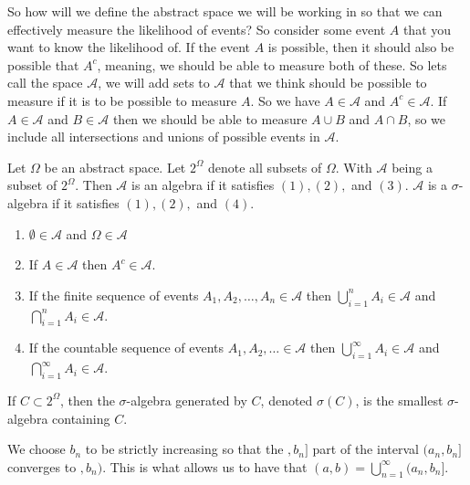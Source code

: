 \documentclass[../main.tex]{subfiles}
\begin{document}
\begin{remark}
So how will we define the abstract space we will be working in so that we can effectively measure the likelihood of events? So consider some event $A$ that you want to know the likelihood of. If the event $A$ is possible, then it should also be possible that $A^c$, meaning, we should be able to measure both of these. So lets call the space $\mathcal{A}$, we will add sets to $\mathcal{A}$ that we think should be possible to measure if it is to be possible to measure $A$. So we have $A \in \mathcal{A}$ and $ A^c \in \mathcal{A} $. If $A \in \mathcal{A}$ and $ B \in \mathcal{A} $ then we should be able to measure $ A \cup B $ and $ A \cap B $, so we include all intersections and unions of possible events in $\mathcal{A}$.
\end{remark}



\begin{definition}\label{def:sigma algebra}
Let $\Omega$ be an abstract space. Let $2^{\Omega}$ denote all subsets of $\Omega$. With $\mathcal{A}$ being a subset of $2^\Omega$. Then $\mathcal{A}$ is an algebra if it satisfies $(1),(2),$ and $(3)$. $\mathcal{A}$ is a $\sigma$-algebra if it satisfies $(1), (2),$ and $(4)$.
\begin{enumerate}
    \item $\emptyset \in \mathcal{A}$ and $\Omega \in \mathcal{A}$
    \item If $ A \in \mathcal{A}$ then $A^c \in \mathcal{A}$.
    \item If the finite sequence of events $A_1, A_2, \dots ,A_n \in \mathcal{A}$ then $\bigcup^n_{i=1}{A_i} \in \mathcal{A}$ and $\bigcap^n_{i=1}{A_i} \in \mathcal{A}$.
    \item If the countable sequence of events $A_1, A_2, \dots \in \mathcal{A}$ then $\bigcup^\infty_{i=1}{A_i} \in \mathcal{A}$ and $ \bigcap^\infty_{i=1}{A_i} \in \mathcal{A}    $. 
\end{enumerate}
    
\end{definition}



\begin{remark}
If $ C \subset 2^\Omega$, then the $\sigma$-algebra generated by $C$, denoted $ \sigma(C) $, is the smallest $ \sigma $-algebra containing $C$.
\end{remark}

We choose $b_n$ to be strictly increasing so that the $ ,b_n]$ part of the interval $ (a_n, b_n] $ converges to $ , b_n)$. This is what allows us to have that $(a,b) = \bigcup^\infty_{n=1}{(a_n, b_n]}$. 
\end{document}
